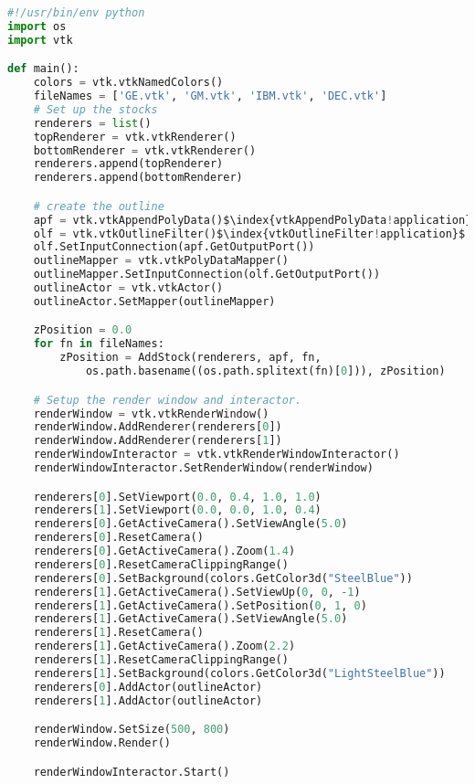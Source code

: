 \begin{lstlisting}[language=Python, caption={Stocks1.py}, escapechar=\$]
#!/usr/bin/env python
import os
import vtk

def main():
    colors = vtk.vtkNamedColors()
    fileNames = ['GE.vtk', 'GM.vtk', 'IBM.vtk', 'DEC.vtk']
    # Set up the stocks
    renderers = list()
    topRenderer = vtk.vtkRenderer()
    bottomRenderer = vtk.vtkRenderer()
    renderers.append(topRenderer)
    renderers.append(bottomRenderer)

    # create the outline
    apf = vtk.vtkAppendPolyData()$\index{vtkAppendPolyData!application}$
    olf = vtk.vtkOutlineFilter()$\index{vtkOutlineFilter!application}$
    olf.SetInputConnection(apf.GetOutputPort())
    outlineMapper = vtk.vtkPolyDataMapper()
    outlineMapper.SetInputConnection(olf.GetOutputPort())
    outlineActor = vtk.vtkActor()
    outlineActor.SetMapper(outlineMapper)

    zPosition = 0.0
    for fn in fileNames:
        zPosition = AddStock(renderers, apf, fn,
            os.path.basename((os.path.splitext(fn)[0])), zPosition)

    # Setup the render window and interactor.
    renderWindow = vtk.vtkRenderWindow()
    renderWindow.AddRenderer(renderers[0])
    renderWindow.AddRenderer(renderers[1])
    renderWindowInteractor = vtk.vtkRenderWindowInteractor()
    renderWindowInteractor.SetRenderWindow(renderWindow)

    renderers[0].SetViewport(0.0, 0.4, 1.0, 1.0)
    renderers[1].SetViewport(0.0, 0.0, 1.0, 0.4)
    renderers[0].GetActiveCamera().SetViewAngle(5.0)
    renderers[0].ResetCamera()
    renderers[0].GetActiveCamera().Zoom(1.4)
    renderers[0].ResetCameraClippingRange()
    renderers[0].SetBackground(colors.GetColor3d("SteelBlue"))
    renderers[1].GetActiveCamera().SetViewUp(0, 0, -1)
    renderers[1].GetActiveCamera().SetPosition(0, 1, 0)
    renderers[1].GetActiveCamera().SetViewAngle(5.0)
    renderers[1].ResetCamera()
    renderers[1].GetActiveCamera().Zoom(2.2)
    renderers[1].ResetCameraClippingRange()
    renderers[1].SetBackground(colors.GetColor3d("LightSteelBlue"))
    renderers[0].AddActor(outlineActor)
    renderers[1].AddActor(outlineActor)

    renderWindow.SetSize(500, 800)
    renderWindow.Render()

    renderWindowInteractor.Start()



\end{lstlisting}
